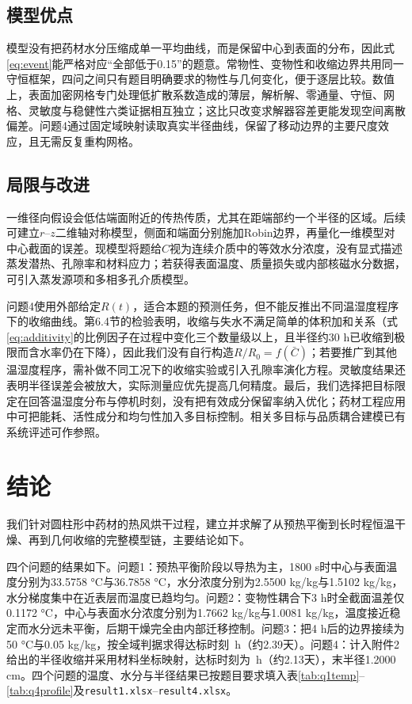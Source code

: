 \documentclass[zihao=-4,UTF8]{ctexart}
\begin{document}
\subsection{模型优点}
模型没有把药材水分压缩成单一平均曲线，而是保留中心到表面的分布，因此式\eqref{eq:event}能严格对应“全部低于0.15”的题意。常物性、变物性和收缩边界共用同一守恒框架，四问之间只有题目明确要求的物性与几何变化，便于逐层比较。数值上，表面加密网格专门处理低扩散系数造成的薄层，解析解、零通量、守恒、网格、灵敏度与稳健性六类证据相互独立；这比只改变求解器容差更能发现空间离散偏差。问题4通过固定域映射读取真实半径曲线，保留了移动边界的主要尺度效应，且无需反复重构网格。

\subsection{局限与改进}
一维径向假设会低估端面附近的传热传质，尤其在距端部约一个半径的区域。后续可建立$r$--$z$二维轴对称模型，侧面和端面分别施加Robin边界，再量化一维模型对中心截面的误差。现模型将题给$C$视为连续介质中的等效水分浓度，没有显式描述蒸发潜热、孔隙率和材料应力；若获得表面温度、质量损失或内部核磁水分数据，可引入蒸发源项和多相多孔介质模型\cite{ref11}。

问题4使用外部给定$R(t)$，适合本题的预测任务，但不能反推出不同温湿度程序下的收缩曲线。第6.4节的检验表明，收缩与失水不满足简单的体积加和关系（式\eqref{eq:additivity}的比例因子在过程中变化三个数量级以上，且半径约30 h已收缩到极限而含水率仍在下降），因此我们没有自行构造$R/R_0=f(\bar C)$；若要推广到其他温湿度程序，需补做不同工况下的收缩实验或引入孔隙率演化方程。灵敏度结果还表明半径误差会被放大，实际测量应优先提高几何精度。最后，我们选择把目标限定在回答温湿度分布与停机时刻，没有把有效成分保留率纳入优化；药材工程应用中可把能耗、活性成分和均匀性加入多目标控制\cite{ref1,ref12}。相关多目标与品质耦合建模已有系统评述可作参照\cite{ref13}。

\section{结论}
我们针对圆柱形中药材的热风烘干过程，建立并求解了从预热平衡到长时程恒温干燥、再到几何收缩的完整模型链，主要结论如下。

四个问题的结果如下。问题1：预热平衡阶段以导热为主，1800 s时中心与表面温度分别为33.5758 °C与36.7858 °C，水分浓度分别为2.5500 kg/kg与1.5102 kg/kg，水分梯度集中在近表层而温度已趋均匀。问题2：变物性耦合下3 h时全截面温差仅0.1172 °C，中心与表面水分浓度分别为1.7662 kg/kg与1.0081 kg/kg，温度接近稳定而水分远未平衡，后期干燥完全由内部迁移控制。问题3：把4 h后的边界接续为50 °C与0.05 kg/kg，按全域判据求得达标时刻\QThreeEventHours\ h（约2.39天）。问题4：计入附件2给出的半径收缩并采用材料坐标映射，达标时刻为\QFourEventHours\ h（约2.13天），末半径1.2000 cm。四个问题的温度、水分与半径结果已按题目要求填入表\ref{tab:q1temp}--\ref{tab:q4profile}及\texttt{result1.xlsx}--\texttt{result4.xlsx}。
\end{document}
